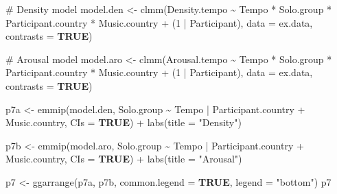 \documentclass[
  bookmarksnumbered]{article}
\newenvironment{Shaded}{\begin{snugshade}}{\end{snugshade}}
\newcommand{\AttributeTok}[1]{\textcolor[rgb]{0.80,0.80,0.80}{#1}}
\newcommand{\CommentTok}[1]{\textcolor[rgb]{0.50,0.62,0.50}{#1}}
\newcommand{\ConstantTok}[1]{\textcolor[rgb]{0.86,0.64,0.64}{\textbf{#1}}}
\newcommand{\DecValTok}[1]{\textcolor[rgb]{0.86,0.86,0.80}{#1}}
\newcommand{\FunctionTok}[1]{\textcolor[rgb]{0.94,0.94,0.56}{#1}}
\newcommand{\NormalTok}[1]{\textcolor[rgb]{0.80,0.80,0.80}{#1}}
\newcommand{\OtherTok}[1]{\textcolor[rgb]{0.94,0.94,0.56}{#1}}
\newcommand{\SpecialCharTok}[1]{\textcolor[rgb]{0.86,0.64,0.64}{#1}}
\newcommand{\StringTok}[1]{\textcolor[rgb]{0.80,0.58,0.58}{#1}}
\begin{document}
\begin{Shaded}
\begin{Highlighting}[]
\CommentTok{\# Density model}
\NormalTok{model.den }\OtherTok{\textless{}{-}} \FunctionTok{clmm}\NormalTok{(Density.tempo }\SpecialCharTok{\textasciitilde{}}\NormalTok{ Tempo }\SpecialCharTok{*}\NormalTok{ Solo.group }\SpecialCharTok{*}\NormalTok{ Participant.country }\SpecialCharTok{*}\NormalTok{ Music.country }\SpecialCharTok{+}\NormalTok{ (}\DecValTok{1} \SpecialCharTok{|}\NormalTok{ Participant), }
              \AttributeTok{data =}\NormalTok{ ex.data,}
              \AttributeTok{contrasts =} \ConstantTok{TRUE}\NormalTok{)}

\CommentTok{\# Arousal model}
\NormalTok{model.aro }\OtherTok{\textless{}{-}} \FunctionTok{clmm}\NormalTok{(Arousal.tempo }\SpecialCharTok{\textasciitilde{}}\NormalTok{ Tempo }\SpecialCharTok{*}\NormalTok{ Solo.group }\SpecialCharTok{*}\NormalTok{ Participant.country }\SpecialCharTok{*}\NormalTok{ Music.country }\SpecialCharTok{+}\NormalTok{ (}\DecValTok{1} \SpecialCharTok{|}\NormalTok{ Participant), }
              \AttributeTok{data =}\NormalTok{ ex.data,}
              \AttributeTok{contrasts =} \ConstantTok{TRUE}\NormalTok{)}

\NormalTok{p7a }\OtherTok{\textless{}{-}} \FunctionTok{emmip}\NormalTok{(model.den, Solo.group }\SpecialCharTok{\textasciitilde{}}\NormalTok{ Tempo }\SpecialCharTok{|}\NormalTok{ Participant.country }\SpecialCharTok{+}\NormalTok{ Music.country,}
      \AttributeTok{CIs =} \ConstantTok{TRUE}\NormalTok{) }\SpecialCharTok{+}
  \FunctionTok{labs}\NormalTok{(}\AttributeTok{title =} \StringTok{"Density"}\NormalTok{)}

\NormalTok{p7b }\OtherTok{\textless{}{-}} \FunctionTok{emmip}\NormalTok{(model.aro, Solo.group }\SpecialCharTok{\textasciitilde{}}\NormalTok{ Tempo }\SpecialCharTok{|}\NormalTok{ Participant.country }\SpecialCharTok{+}\NormalTok{ Music.country,}
      \AttributeTok{CIs =} \ConstantTok{TRUE}\NormalTok{) }\SpecialCharTok{+}
  \FunctionTok{labs}\NormalTok{(}\AttributeTok{title =} \StringTok{"Arousal"}\NormalTok{)}

\NormalTok{p7 }\OtherTok{\textless{}{-}} \FunctionTok{ggarrange}\NormalTok{(p7a, p7b,}
                \AttributeTok{common.legend =} \ConstantTok{TRUE}\NormalTok{,}
                \AttributeTok{legend =} \StringTok{"bottom"}\NormalTok{)}
\NormalTok{p7}
\end{Highlighting}
\end{Shaded}
\end{document}
